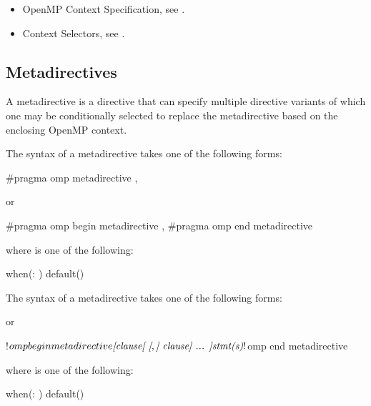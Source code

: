 \crossreferences
\begin{itemize}
\item OpenMP Context Specification, see .
\item Context Selectors, see .
\end{itemize}


\subsection{Metadirectives}
\label{subsec:Metadirective Meta-Directive}
\summary
A metadirective is a directive that can specify multiple directive variants
of which one may be conditionally selected to replace the metadirective based
on the enclosing OpenMP context.

\syntax
\begin{ccppspecific}
The syntax of a metadirective takes one of the
following forms:
\begin{ompcPragma}
#pragma omp metadirective \plc{[clause[ [},\plc{] clause] ... ] new-line}
\end{ompcPragma}
or
\begin{ompcPragma}
#pragma omp begin metadirective \plc{[clause[ [},\plc{] clause] ... ] new-line}
#pragma omp end metadirective
\end{ompcPragma}


\begin{samepage}
where  is one of the following:
\begin{indentedcodelist}
when(: )
default()
\end{indentedcodelist}
\end{samepage}

\end{ccppspecific}

\begin{fortranspecific}
The syntax of a metadirective takes one of the following forms:


or

\begin{ompfPragma}
!$omp begin metadirective \plc{[clause[ [},\plc{] clause] ... ]}
!$omp end metadirective
\end{ompfPragma}

\begin{samepage}
where  is one of the following:

\begin{indentedcodelist}
when(: )
default()
\end{indentedcodelist}
\end{samepage}

\end{fortranspecific}

